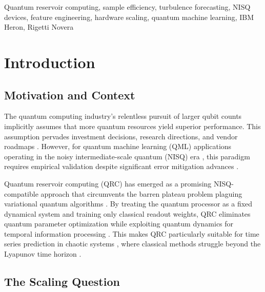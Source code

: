 \documentclass[conference]{IEEEtran}
\begin{document}
\begin{IEEEkeywords}
Quantum reservoir computing, sample efficiency, turbulence forecasting, NISQ devices, feature engineering, hardware scaling, quantum machine learning, IBM Heron, Rigetti Novera
\end{IEEEkeywords}


\section{Introduction}

\subsection{Motivation and Context}

The quantum computing industry's relentless pursuit of larger qubit counts implicitly assumes that more quantum resources yield superior performance. This assumption pervades investment decisions, research directions, and vendor roadmaps \cite{ibm2024eagle, rigetti2024novera, arute2019quantum}. However, for quantum machine learning (QML) applications \cite{biamonte2017quantum, schuld2021effect, havlicek2019supervised} operating in the noisy intermediate-scale quantum (NISQ) era \cite{preskill2018quantum, bharti2022noisy, kandala2019error}, this paradigm requires empirical validation despite significant error mitigation advances \cite{temme2017error}.

Quantum reservoir computing (QRC) has emerged as a promising NISQ-compatible approach that circumvents the barren plateau problem plaguing variational quantum algorithms \cite{mcclean2018barren, cerezo2021variational}. By treating the quantum processor as a fixed dynamical system and training only classical readout weights, QRC eliminates quantum parameter optimization while exploiting quantum dynamics for temporal information processing \cite{fujii2017harnessing, ghosh2019quantum, mujal2021opportunities, chen2020temporal, nokkala2021gaussian}. This makes QRC particularly suitable for time series prediction in chaotic systems \cite{lorenz1963deterministic, eckmann1985ergodic}, where classical methods struggle beyond the Lyapunov time horizon \cite{pathak2018model, pathak2017using, vlachas2018data}.

\subsection{The Scaling Question}
\end{document}
